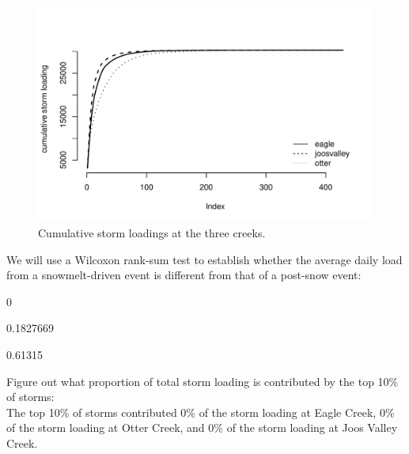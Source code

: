 \documentclass[12pt]{article}
\begin{document}
\begin{figure}
    \begin{center}
\includegraphics{loadings-figure1}
    \end{center}
    \caption{Cumulative storm loadings at the three creeks.\label{cdf}}
\end{figure}




We will use a Wilcoxon rank-sum test to establish whether the average daily load from a snowmelt-driven event is different from that of a post-snow event:\\




\begin{Schunk}
\begin{Soutput}
[1] 0
\end{Soutput}
\end{Schunk}




\begin{Schunk}
\begin{Soutput}
[1] 0.1827669
\end{Soutput}
\begin{Soutput}
[1] 0.61315
\end{Soutput}
\end{Schunk}




Figure out what proportion of total storm loading is contributed by the top 10\% of storms:\\








The top 10\% of storms contributed 0\% of the storm loading at Eagle Creek, 0\% of the storm loading at Otter Creek, and 0\% of the storm loading at Joos Valley Creek.\\
\end{document}
